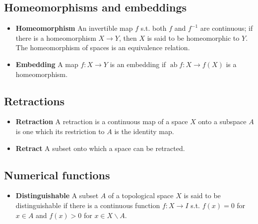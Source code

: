 \documentclass{article}
\DeclareMathOperator{\ab}{ab}
\begin{document}
\subsection{Homeomorphisms and embeddings}
\begin{itemize}
\item \textbf{Homeomorphism} An invertible map \(f\) s.t. both \(f\) and \(f^{-1}\) are continuous; if there is a homeomorphism \(X\to Y\), then \(X\) is said to be homeomorphic to \(Y\). 
The homeomorphism of spaces is an equivalence relation.
\item \textbf{Embedding} A map \(f:X\to Y\) is an embedding if \(\ab f:X\to f(X)\) is a homeomorphism.
\end{itemize}
\subsection{Retractions}
\begin{itemize}
\item \textbf{Retraction} A retraction is a continuous map of a space \(X\) onto a subspace \(A\) is one which its restriction to \(A\) is the identity map.
\item \textbf{Retract} A subset onto which a space can be retracted.
\end{itemize}
\subsection{Numerical functions}
\begin{itemize}
\item \textbf{Distinguishable} A subset \(A\) of a topological space \(X\) is said to be distinguishable if there is a continuous function \(f:X\to I\) s.t. \(f(x)=0\) for \(x\in A\) and \(f(x)>0\) for \(x\in X\backslash A\).
\end{itemize}
\end{document}
